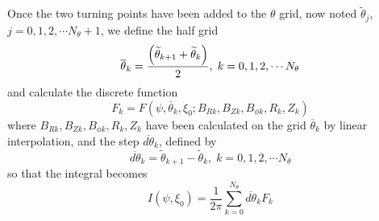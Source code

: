 Once the two turning points have been added to the $\theta $ grid, now noted
$\widetilde{\theta }_{j}$, $j=0,1,2,\cdots N_{\theta }+1$, we define the
half grid
\begin{equation}
\overline{\theta }_{k}=\frac{\left( \widetilde{\theta }_{k+1}+\widetilde{%
\theta }_{k}\right) }{2},\;k=0,1,2,\cdots N_{\theta }
\end{equation}
and calculate the discrete function
\begin{equation}
F_{k}=F\left( \psi ,\overline{\theta }_{k},\xi _{0};B_{Rk},B_{Zk},B_{\phi
k},R_{k},Z_{k}\right)
\end{equation}
where $B_{Rk},B_{Zk},B_{\phi k},R_{k},Z_{k}$ have been calculated on the
grid $\overline{\theta }_{k}$ by linear interpolation, and the step $%
\overline{d\theta }_{k}$, defined by
\begin{equation}
\overline{d\theta }_{k}=\widetilde{\theta }_{k+1}-\widetilde{\theta }
_{k},\;k=0,1,2,\cdots N_{\theta }
\end{equation}
so that the integral becomes
\begin{equation}
I\left( \psi ,\xi _{0}\right) =\frac{1}{2\pi }\sum_{k=0}^{N_{\theta }}%
\overline{d\theta }_{k}F_{k}
\end{equation}
